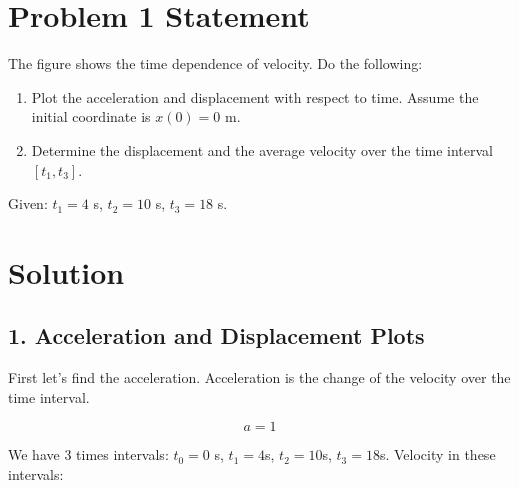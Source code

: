\documentclass{article}
\begin{document}


\section*{Problem 1 Statement}
The figure shows the time dependence of velocity. Do the following:

\begin{enumerate}
    \item Plot the acceleration and displacement with respect to time. Assume the initial coordinate is $x(0) = 0$ m.
    \item Determine the displacement and the average velocity over the time interval $[t_1, t_3]$.
\end{enumerate}

Given: $t_1 = 4$ s, $t_2 = 10$ s, $t_3 = 18$ s.

\section*{Solution}

\subsection*{1. Acceleration and Displacement Plots}
First let's find the acceleration. Acceleration is the change of the velocity over the time interval.

$$ a = 1 $$

We have 3 times intervals: $t_0 = 0$ s, $t_1 = 4$s, $t_2 = 10$s, $t_3 = 18$s.
\bigbreak
Velocity in these intervals: 
\end{document}
